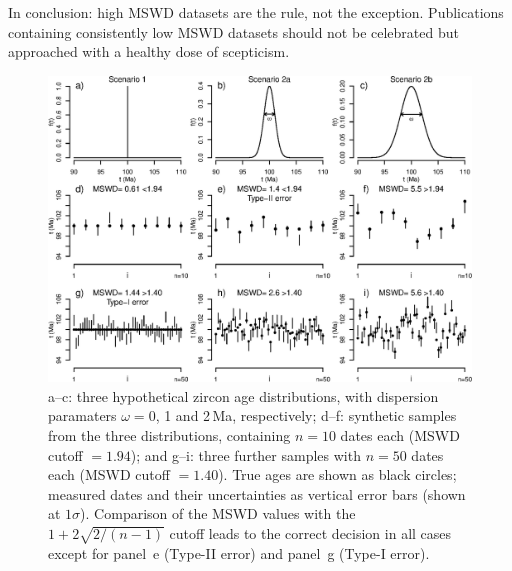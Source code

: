 \documentclass{article}
\begin{document}
In conclusion: high MSWD datasets are the rule, not the exception.
Publications containing consistently low MSWD datasets should not be
celebrated but approached with a healthy dose of scepticism.

\begin{figure}[!ht]
  \includegraphics[width=\textwidth]{MSWD.eps}
  \caption{a--c: three hypothetical zircon age distributions, with
    dispersion paramaters $\omega = 0$, 1 and 2\,Ma, respectively;
    d--f: synthetic samples from the three distributions, containing
    $n=10$ dates each (MSWD cutoff $=1.94$); and g--i: three further
    samples with $n=50$ dates each (MSWD cutoff $=1.40$). True ages
    are shown as black circles; measured dates and their uncertainties
    as vertical error bars (shown at $1\sigma$). Comparison of the
    MSWD values with the $1+2\sqrt{2/(n-1)}$ cutoff leads to the
    correct decision in all cases except for panel~e (Type-II error)
    and panel~g (Type-I error).}
  \label{fig:MSWD}
\end{figure}

%
%
\end{document}

